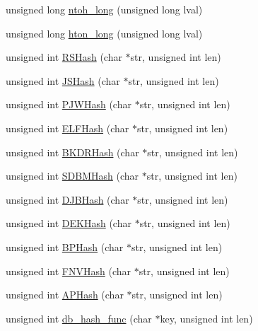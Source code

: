 \begin{DoxyCompactItemize}
\item 
unsigned long \mbox{\hyperlink{namespaceFILEDB_af2fbdeeb7148fa47d1050b1ac3130897}{ntoh\+\_\+long}} (unsigned long lval)
\item 
unsigned long \mbox{\hyperlink{namespaceFILEDB_af381773a642a4cc9c68ce682cea411a8}{hton\+\_\+long}} (unsigned long lval)
\item 
unsigned int \mbox{\hyperlink{namespaceFILEDB_ac69ca4109f796be06f658542b20a3eb1}{R\+S\+Hash}} (char $\ast$str, unsigned int len)
\item 
unsigned int \mbox{\hyperlink{namespaceFILEDB_a3533131675008d2c3b9b3d1685b2e679}{J\+S\+Hash}} (char $\ast$str, unsigned int len)
\item 
unsigned int \mbox{\hyperlink{namespaceFILEDB_ab2508d2100ad31133a86ce47aada4241}{P\+J\+W\+Hash}} (char $\ast$str, unsigned int len)
\item 
unsigned int \mbox{\hyperlink{namespaceFILEDB_ad02d1b620691350d964deb5beab272eb}{E\+L\+F\+Hash}} (char $\ast$str, unsigned int len)
\item 
unsigned int \mbox{\hyperlink{namespaceFILEDB_a06c984d24be338a8cfa3fcd1296914aa}{B\+K\+D\+R\+Hash}} (char $\ast$str, unsigned int len)
\item 
unsigned int \mbox{\hyperlink{namespaceFILEDB_a93a0c708c1ad9c299200dbaa873c5531}{S\+D\+B\+M\+Hash}} (char $\ast$str, unsigned int len)
\item 
unsigned int \mbox{\hyperlink{namespaceFILEDB_a7d5f1ce86b07fb3c5ec314fab9bd5e30}{D\+J\+B\+Hash}} (char $\ast$str, unsigned int len)
\item 
unsigned int \mbox{\hyperlink{namespaceFILEDB_ab2561866ca3a62230f86ec7860fec260}{D\+E\+K\+Hash}} (char $\ast$str, unsigned int len)
\item 
unsigned int \mbox{\hyperlink{namespaceFILEDB_a81bebe16f4e0ccc238b04621af6ada41}{B\+P\+Hash}} (char $\ast$str, unsigned int len)
\item 
unsigned int \mbox{\hyperlink{namespaceFILEDB_ab7ad322a4b472713751d23b4b6495ddf}{F\+N\+V\+Hash}} (char $\ast$str, unsigned int len)
\item 
unsigned int \mbox{\hyperlink{namespaceFILEDB_a23c71972866e86f222ad440284380f45}{A\+P\+Hash}} (char $\ast$str, unsigned int len)
\item 
unsigned int \mbox{\hyperlink{namespaceFILEDB_a506040cd2b9f1527e415461aac226fb5}{db\+\_\+hash\+\_\+func}} (char $\ast$key, unsigned int len)
\end{DoxyCompactItemize}
